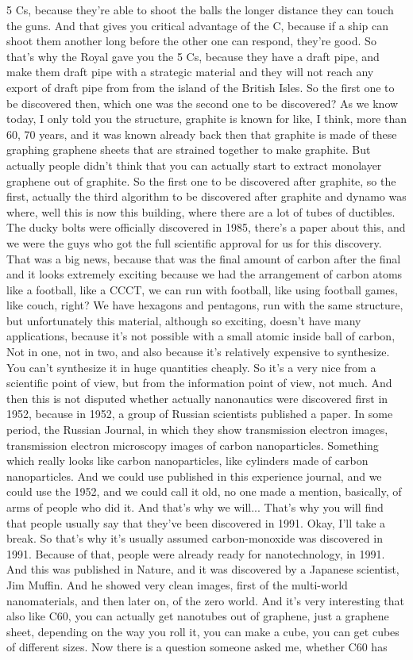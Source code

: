 5 Cs, because they're able to shoot the balls the longer distance they can touch the guns. And that gives you critical advantage of the C, because if a ship can shoot them another long before the other one can respond, they're good. So that's why the Royal gave you the 5 Cs, because they have a draft pipe, and make them draft pipe with a strategic material and they will not reach any export of draft pipe from from the island of the British Isles. So the first one to be discovered then, which one was the second one to be discovered? As we know today, I only told you the structure, graphite is known for like, I think, more than 60, 70 years, and it was known already back then that graphite is made of these graphing graphene sheets that are strained together to make graphite. But actually people didn't think that you can actually start to extract monolayer graphene out of graphite. So the first one to be discovered after graphite, so the first, actually the third algorithm to be discovered after graphite and dynamo was where, well this is now this building, where there are a lot of tubes of ductibles. The ducky bolts were officially discovered in 1985, there's a paper about this, and we were the guys who got the full scientific approval for us for this discovery. That was a big news, because that was the final amount of carbon after the final and it looks extremely exciting because we had the arrangement of carbon atoms like a football, like a CCCT, we can run with football, like using football games, like couch, right? We have hexagons and pentagons, run with the same structure, but unfortunately this material, although so exciting, doesn't have many applications, because it's not possible with a small atomic inside ball of carbon, Not in one, not in two, and also because it's relatively expensive to synthesize. You can't synthesize it in huge quantities cheaply. So it's a very nice from a scientific point of view, but from the information point of view, not much. And then this is not disputed whether actually nanonautics were discovered first in 1952, because in 1952, a group of Russian scientists published a paper. In some period, the Russian Journal, in which they show transmission electron images, transmission electron microscopy images of carbon nanoparticles. Something which really looks like carbon nanoparticles, like cylinders made of carbon nanoparticles. And we could use published in this experience journal, and we could use the 1952, and we could call it old, no one made a mention, basically, of arms of people who did it. And that's why we will... That's why you will find that people usually say that they've been discovered in 1991. Okay, I'll take a break. So that's why it's usually assumed carbon-monoxide was discovered in 1991. Because of that, people were already ready for nanotechnology, in 1991. And this was published in Nature, and it was discovered by a Japanese scientist, Jim Muffin. And he showed very clean images, first of the multi-world nanomaterials, and then later on, of the zero world. And it's very interesting that also like C60, you can actually get nanotubes out of graphene, just a graphene sheet, depending on the way you roll it, you can make a cube, you can get cubes of different sizes. Now there is a question someone asked me, whether C60 has 